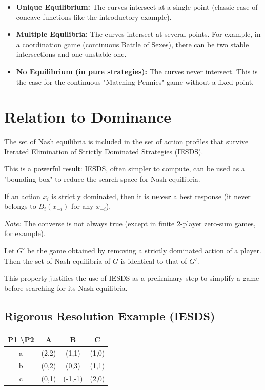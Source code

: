 \begin{itemize}
    \item \textbf{Unique Equilibrium:} The curves intersect at a single point (classic case of concave functions like the introductory example).
    \item \textbf{Multiple Equilibria:} The curves intersect at several points. For example, in a coordination game (continuous Battle of Sexes), there can be two stable intersections and one unstable one.
    \item \textbf{No Equilibrium (in pure strategies):} The curves never intersect. This is the case for the continuous "Matching Pennies" game without a fixed point.
\end{itemize}

\section{Relation to Dominance}

\begin{corollaire}
The set of Nash equilibria is included in the set of action profiles that survive Iterated Elimination of Strictly Dominated Strategies (IESDS).
\end{corollaire}
\begin{remarque}
This is a powerful result: IESDS, often simpler to compute, can be used as a "bounding box" to reduce the search space for Nash equilibria.
\end{remarque}

\begin{proposition}
If an action $x_i$ is strictly dominated, then it is \textbf{never} a best response (it never belongs to $B_i(x_{-i})$ for any $x_{-i}$).
\end{proposition}
\textit{Note:} The converse is not always true (except in finite 2-player zero-sum games, for example).

\begin{proposition}
Let $G'$ be the game obtained by removing a strictly dominated action of a player. Then the set of Nash equilibria of $G$ is identical to that of $G'$.
\end{proposition}
This property justifies the use of IESDS as a preliminary step to simplify a game before searching for its Nash equilibria.

\subsection{Rigorous Resolution Example (IESDS)}
\begin{center}
\begin{tabular}{c|c|c|c}
P1 \textbackslash P2 & A & B & C \\ \hline
a & (2,2) & (1,1) & (1,0) \\ \hline
b & (0,2) & (0,3) & (1,1) \\ \hline
c & (0,1) & (-1,-1) & (2,0)
\end{tabular}
\end{center}

